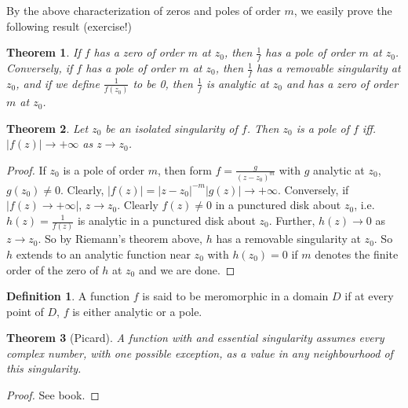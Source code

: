 \documentclass[12pt, a4paper]{article}
\theoremstyle{plain}
\newtheorem{thm}{Theorem} %
\theoremstyle{definition}
\newtheorem{definition}{Definition} %
\begin{document}
		By the above characterization of zeros and poles of order $m$, we easily prove the following result (exercise!)\\

		\begin{thm}
			If $f$ has a zero of order $m$ at $z_0$, then $\frac{1}{f}$ has a pole of order $m$ at $z_0$. Conversely, if $f$ has a pole of order $m$ at $z_0$, then $\frac{1}{f}$ has a removable singularity at $z_0$, and if we define $\frac{1}{f(z_0)}$ to be 0, then $\frac{1}{f}$ is analytic at $z_0$ and has a zero of order $m$ at $z_0$.\\
		\end{thm}

		\begin{thm}
			Let $z_0$ be an isolated singularity of $f$. Then $z_0$ is a pole of $f$ iff. $|f(z)|\to +\infty$ as $z\to z_0$.
		\end{thm}

		\begin{proof}
			If $z_0$ is a pole of order $m$, then form $f= \frac{g}{(z-z_0)^m}$ with $g$ analytic at $z_0$, $g(z_0)\not = 0$. Clearly, $|f(z)| = |z-z_0|^{-m}|g(z)|\to+\infty$. Conversely, if $|f(z)\to +\infty|$, $z\to z_0$. Clearly $f(z)\not=0$ in a punctured disk about $z_0$, i.e. $h(z) = \frac{1}{f(z)}$ is analytic in a punctured disk about $z_0$. Further, $h(z)\to 0$ as $z\to z_0$. So by Riemann's theorem above, $h$ has a removable singularity at $z_0$. So $h$ extends to an analytic function near $z_0$ with $h(z_0)=0$ if $m$ denotes the finite order of the zero of $h$ at $z_0$ and we are done.
		\end{proof}

		\begin{definition}
			A function $f$ is said to be meromorphic in a domain $D$ if at every point of $D$, $f$ is either analytic or a pole.\\
		\end{definition}

		\begin{thm}[Picard]
		\label{thm:picard}
			A function with and essential singularity assumes every complex number, with one possible exception, as a value in any neighbourhood of this singularity.
		\end{thm}

		\begin{proof}
			See book.
		\end{proof}
\end{document}
